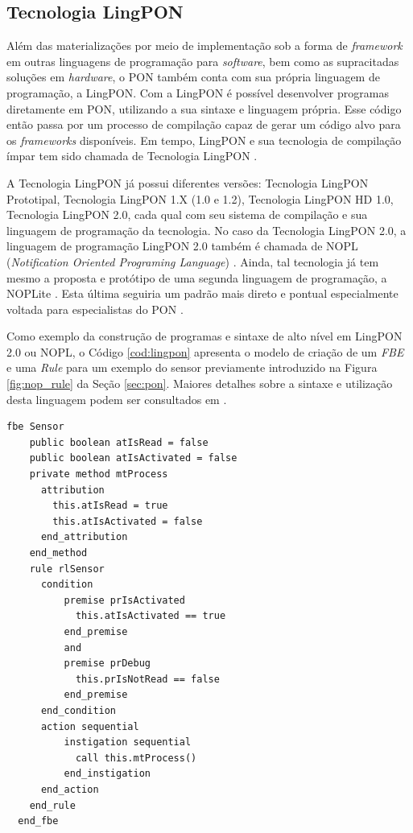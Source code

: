 \subsection{Tecnologia LingPON}\label{sec:lingpon}

Além das materializações por meio de implementação sob a forma de
\textit{framework} em outras linguagens de programação para \textit{software},
bem como as supracitadas soluções em \textit{hardware}, o PON também conta com
sua própria linguagem de programação, a LingPON. Com a LingPON é possível
desenvolver programas diretamente em PON, utilizando a sua sintaxe e linguagem
própria. Esse código então passa por um processo de compilação capaz de gerar um
código alvo para os \textit{frameworks} disponíveis. Em tempo, LingPON e sua
tecnologia de compilação ímpar tem sido chamada de Tecnologia LingPON
\cite{doc_ronszcka_2019}.

A Tecnologia LingPON já possui diferentes versões: Tecnologia LingPON
Prototipal, Tecnologia LingPON 1.X (1.0 e 1.2), Tecnologia LingPON HD 1.0,
Tecnologia LingPON 2.0, cada qual com seu sistema de compilação e sua linguagem
de programação da tecnologia. No caso da Tecnologia LingPON 2.0, a linguagem de
programação LingPON 2.0 também é chamada de NOPL (\textit{Notification Oriented
Programing Language}) \cite{doc_ronszcka_2019}. Ainda, tal tecnologia já tem
mesmo a proposta e protótipo de uma segunda linguagem de programação, a NOPLite
\cite{chierichi_2020}. Esta última seguiria um padrão mais direto e pontual
especialmente voltada para especialistas do PON \cite{doc_ronszcka_2019}.

Como exemplo da construção de programas e sintaxe de alto nível em LingPON 2.0
ou NOPL, o Código \ref{cod:lingpon} apresenta o modelo de criação de um
\textit{FBE} e uma \textit{Rule} para um exemplo do sensor previamente
introduzido na Figura \ref{fig:nop_rule} da Seção \ref{sec:pon}. Maiores
detalhes sobre a sintaxe e utilização desta linguagem podem ser consultados em
\cite{doc_ronszcka_2019}.

\begin{lstlisting}[caption = {Exemplo de construção de entidades na LingPON 2.0}, float=htb,
  source = {Fonte: Autoria própria}, language=nopl,
  label = {cod:lingpon}]
  fbe Sensor
    public boolean atIsRead = false
    public boolean atIsActivated = false
    private method mtProcess
      attribution
        this.atIsRead = true
        this.atIsActivated = false
      end_attribution
    end_method
    rule rlSensor
      condition
          premise prIsActivated
            this.atIsActivated == true
          end_premise
          and
          premise prDebug
            this.prIsNotRead == false
          end_premise
      end_condition
      action sequential
          instigation sequential
            call this.mtProcess()
          end_instigation
      end_action
    end_rule
  end_fbe
\end{lstlisting}

